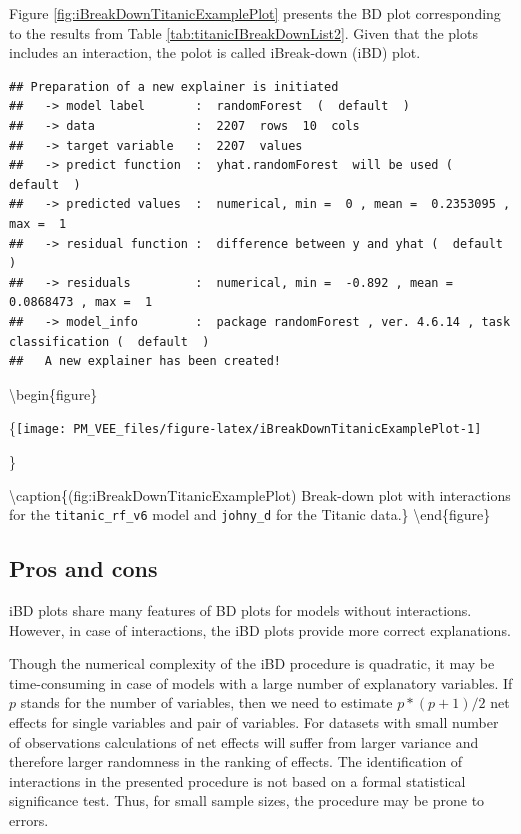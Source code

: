 \documentclass[12pt,]{krantz}
\begin{document}
Figure \ref{fig:iBreakDownTitanicExamplePlot} presents the BD plot corresponding to the results from Table \ref{tab:titanicIBreakDownList2}. Given that the plots includes an interaction, the polot is called iBreak-down (iBD) plot.

\begin{verbatim}
## Preparation of a new explainer is initiated
##   -> model label       :  randomForest  (  default  )
##   -> data              :  2207  rows  10  cols 
##   -> target variable   :  2207  values 
##   -> predict function  :  yhat.randomForest  will be used (  default  )
##   -> predicted values  :  numerical, min =  0 , mean =  0.2353095 , max =  1  
##   -> residual function :  difference between y and yhat (  default  )
##   -> residuals         :  numerical, min =  -0.892 , mean =  0.0868473 , max =  1  
##   -> model_info        :  package randomForest , ver. 4.6.14 , task classification (  default  ) 
##   A new explainer has been created!
\end{verbatim}

\textbackslash{}begin\{figure\}

\{\centering \texttt{[image: PM\_VEE\_files/figure-latex/iBreakDownTitanicExamplePlot-1]}

\}

\textbackslash{}caption\{(fig:iBreakDownTitanicExamplePlot) Break-down plot with interactions for the \texttt{titanic\_rf\_v6} model and \texttt{johny\_d} for the Titanic data.\}\label{fig:iBreakDownTitanicExamplePlot}
\textbackslash{}end\{figure\}

\hypertarget{iBDProsCons}{%
\subsection{Pros and cons}\label{iBDProsCons}}

iBD plots share many features of BD plots for models without interactions. However, in case of interactions, the iBD plots provide more correct explanations.

Though the numerical complexity of the iBD procedure is quadratic, it may be time-consuming in case of models with a large number of explanatory variables. If \(p\) stands for the number of variables, then we need to estimate \(p*(p+1)/2\) net effects for single variables and pair of variables. For datasets with small number of observations calculations of net effects will suffer from larger variance and therefore larger randomness in the ranking of effects.
The identification of interactions in the presented procedure is not based on a formal statistical significance test. Thus, for small sample sizes, the procedure may be prone to errors.
\end{document}

